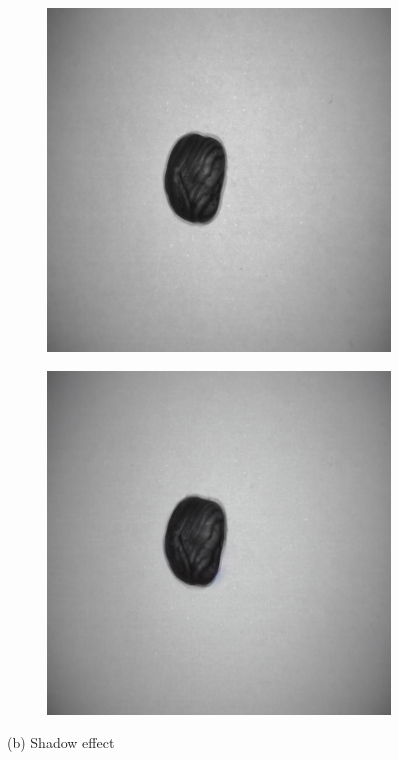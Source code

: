 \documentclass[12pt,DIV14,BCOR12mm,a4paper,footinclude=false,headinclude,parskip=half-,twoside,openright,cleardoublepage=empty,toc=index,bibliography=totoc,listof=totoc]{scrreprt}
\numberwithin{equation}{chapter}
\begin{document}
\begin{figure}
    \vspace{0.3cm} %

    \begin{subfigure}[t]{0.45\textwidth}
        \centering
        \includegraphics[width=\textwidth]{../media/diff_nuts_shadow_real.png}
    \end{subfigure}%
    \hspace{0.02\textwidth}%
    \begin{subfigure}[t]{0.45\textwidth}
        \centering
        \includegraphics[width=\textwidth]{../media/diff_nuts_shadow_fake.png}
    \end{subfigure}
    \caption*{(b) Shadow effect}


\end{figure}
\end{document}
